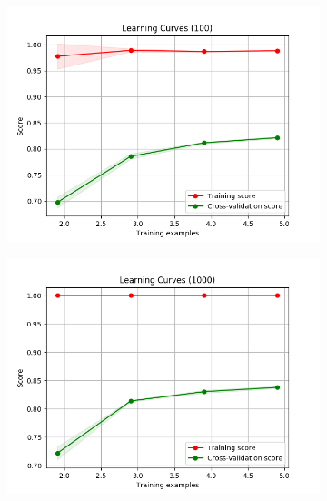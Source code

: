 \documentclass[12pt]{article}
\begin{document}
\begin{figure}[H]
	\centering
    \begin{subfigure}[c]{0.49\textwidth}
        \includegraphics[width=\textwidth]{images/RF100.png}
    \end{subfigure}
    \begin{subfigure}[c]{0.49\textwidth}
        \includegraphics[width=\textwidth]{images/RF1000.png}
    \end{subfigure}
\end{figure}


\end{document}
